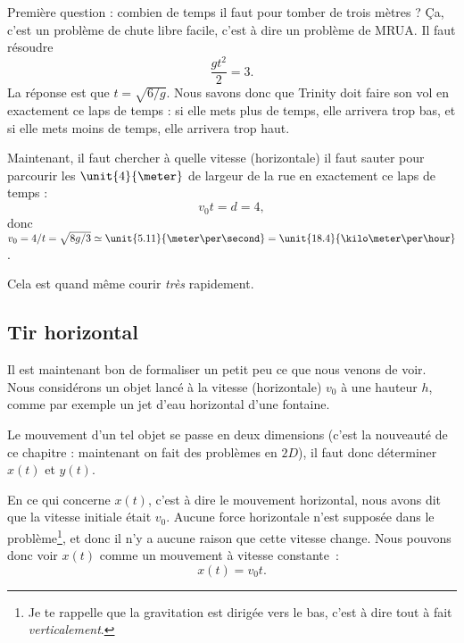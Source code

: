 Première question : combien de temps il faut pour tomber de trois mètres ? Ça, c'est un problème de chute libre facile, c'est à dire un problème de MRUA. Il faut résoudre
\begin{equation}
	\frac{ gt^2 }{ 2 }=3.
\end{equation}
La réponse est que $t=\sqrt{6/g}$. Nous savons donc que Trinity doit faire son vol en exactement ce laps de temps : si elle mets plus de temps, elle arrivera trop bas, et si elle mets moins de temps, elle arrivera trop haut.

Maintenant, il faut chercher à quelle vitesse (horizontale) il faut sauter pour parcourir les $\unit{4}{\meter}$ de largeur de la rue en exactement ce laps de temps :
\begin{equation}
	v_0t=d=4,
\end{equation}
donc $v_0=4/t=\sqrt{8g/3}\simeq \unit{5.11}{\meter\per\second}=\unit{18.4}{\kilo\meter\per\hour}$.

Cela est quand même courir \emph{très} rapidement.

\subsection{Tir horizontal}

Il est maintenant bon de formaliser un petit peu ce que nous venons de voir. Nous considérons un objet lancé à la vitesse (horizontale) $v_0$ à une hauteur $h$, comme par exemple un jet d'eau horizontal d'une fontaine.

Le mouvement d'un tel objet se passe en deux dimensions (c'est la nouveauté de ce chapitre : maintenant on fait des problèmes en $2D$), il faut donc déterminer $x(t)$ et $y(t)$.

En ce qui concerne $x(t)$, c'est à dire le mouvement horizontal, nous avons dit que la vitesse initiale était $v_0$. Aucune force horizontale n'est supposée dans le problème\footnote{Je te rappelle que la gravitation est dirigée vers le bas, c'est à dire tout à fait \emph{verticalement}.}, et donc il n'y a aucune raison que cette vitesse change. Nous pouvons donc voir $x(t)$ comme un mouvement à vitesse constante~:
\begin{equation}		\label{Eqxtvt}
	x(t)=v_0t.
\end{equation}

